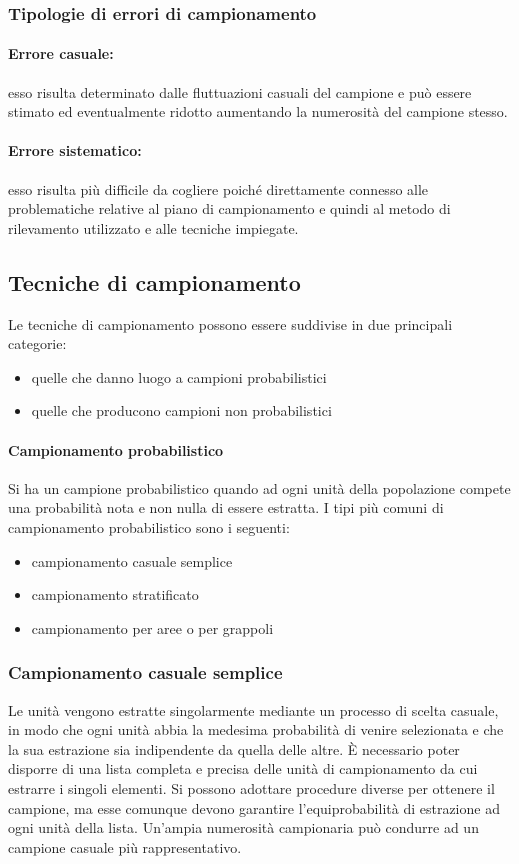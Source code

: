 \subsubsection{Tipologie di errori di campionamento}
\paragraph{Errore casuale:} esso risulta determinato dalle fluttuazioni casuali del campione e può essere stimato ed eventualmente ridotto aumentando la numerosità del campione stesso.

\paragraph{Errore sistematico:} esso risulta più difficile da cogliere poiché direttamente connesso alle problematiche relative al piano di campionamento e quindi al metodo di rilevamento utilizzato e alle tecniche impiegate.

\subsection{Tecniche di campionamento}
Le tecniche di campionamento possono essere suddivise in due principali categorie:
\begin{itemize}
	\item quelle che danno luogo a campioni probabilistici
	\item quelle che producono campioni non probabilistici
\end{itemize}
\paragraph{Campionamento probabilistico}
Si ha un campione probabilistico quando ad ogni unità della popolazione compete una probabilità nota e non nulla di essere estratta. \newline
I tipi più comuni di campionamento probabilistico sono i seguenti:
\begin{itemize}
	\item campionamento casuale semplice
	\item campionamento stratificato
	\item campionamento per aree o per grappoli
\end{itemize}

\subsubsection{Campionamento casuale semplice}
Le unità vengono estratte singolarmente mediante un processo di scelta casuale, in modo che ogni unità abbia la medesima probabilità di venire selezionata e che la sua estrazione sia indipendente da quella delle altre. \newline
È necessario poter disporre di una lista completa e precisa delle unità di campionamento da cui estrarre i singoli elementi. Si possono adottare procedure diverse per ottenere il campione, ma esse comunque devono garantire l’equiprobabilità di estrazione ad ogni unità della lista. \newline
Un’ampia numerosità campionaria può condurre ad un campione casuale più rappresentativo.

